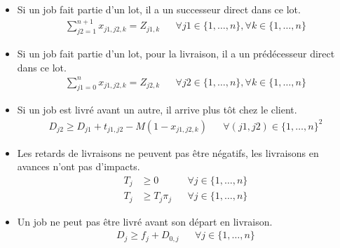 \begin{itemize}
	\item
	      Si un job fait partie d’un lot, il a un successeur direct dans ce lot.
	      \begin{align}
		      \sum_{j2=1}^{n+1} x_{j1,j2,k} = Z_{j1,k} &  &
		      \forall j1 \in\{ 1, \ldots, n\}, \forall k \in\{1, \ldots, n\}
	      \end{align}
	\item
	      Si un job fait partie d’un lot, pour la livraison, il a un prédécesseur direct dans ce lot.
	      \begin{align}
		      \sum_{j1=0}^{n} x_{j1,j2,k} = Z_{j2,k} &  &
		      \forall j2 \in\{ 1, \ldots, n\}, \forall k \in\{1, \ldots, n\}
	      \end{align}
	\item
	      Si un job est livré avant un autre, il arrive plus tôt chez le client.
	      \begin{align}
		      D_{j2}\geq D_{j1} + t_{j1,j2} - M \left(1-x_{j1,j2,k} \right)
			& &
			\forall (j1, j2) \in \{ 1, \ldots, n \}^2
	      \end{align}
	\item
	      Les retards de livraisons ne peuvent pas être négatifs,
	      les livraisons en avances n’ont pas d’impacts.
	      \begin{align}
		      T_j & \geq 0         &  & \forall j \in\{1, \ldots, n\} \\
		      T_j & \geq T_j \pi_j &  & \forall j \in\{1, \ldots, n\}
	      \end{align}
	\item
	      Un job ne peut pas être livré avant son départ en livraison.
	      \begin{align}
		      D_j \geq f_j + D_{0, j} &  & \forall j \in\{1, \ldots, n\}
	      \end{align}
\end{itemize}
